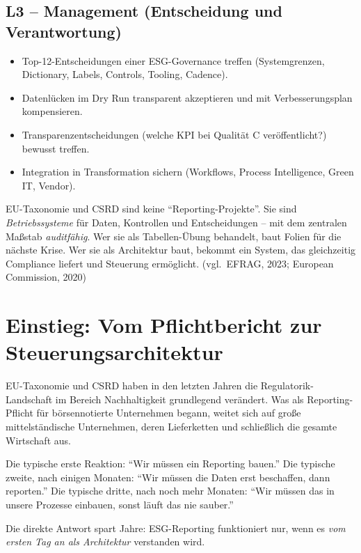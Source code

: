 \documentclass[11pt,a4paper,oneside]{article}
\newcommand{\quelle}[1]{{\footnotesize\color{lpGray}(#1)}}
\begin{document}
\subsection*{L3 -- Management (Entscheidung und Verantwortung)}
\begin{itemize}
  \item Top-12-Entscheidungen einer ESG-Governance treffen (Systemgrenzen, Dictionary, Labels, Controls, Tooling, Cadence).
  \item Datenlücken im Dry Run transparent akzeptieren und mit Verbesserungsplan kompensieren.
  \item Transparenzentscheidungen (welche KPI bei Qualität C veröffentlicht?) bewusst treffen.
  \item Integration in Transformation sichern (Workflows, Process Intelligence, Green IT, Vendor).
\end{itemize}

\begin{merkbox}
EU-Taxonomie und CSRD sind keine ``Reporting-Projekte''. Sie sind \emph{Betriebssysteme} für Daten, Kontrollen und Entscheidungen -- mit dem zentralen Maßstab \emph{auditfähig}. Wer sie als Tabellen-Übung behandelt, baut Folien für die nächste Krise. Wer sie als Architektur baut, bekommt ein System, das gleichzeitig Compliance liefert und Steuerung ermöglicht. \quelle{vgl.\ EFRAG, 2023; European Commission, 2020}
\end{merkbox}

\clearpage

\section{Einstieg: Vom Pflichtbericht zur Steuerungsarchitektur}

EU-Taxonomie und CSRD haben in den letzten Jahren die Regulatorik-Landschaft im Bereich Nachhaltigkeit grundlegend verändert. Was als Reporting-Pflicht für börsennotierte Unternehmen begann, weitet sich auf große mittelständische Unternehmen, deren Lieferketten und schließlich die gesamte Wirtschaft aus.

Die typische erste Reaktion: ``Wir müssen ein Reporting bauen.'' Die typische zweite, nach einigen Monaten: ``Wir müssen die Daten erst beschaffen, dann reporten.'' Die typische dritte, nach noch mehr Monaten: ``Wir müssen das in unsere Prozesse einbauen, sonst läuft das nie sauber.''

Die direkte Antwort spart Jahre: ESG-Reporting funktioniert nur, wenn es \emph{vom ersten Tag an als Architektur} verstanden wird.
\end{document}

